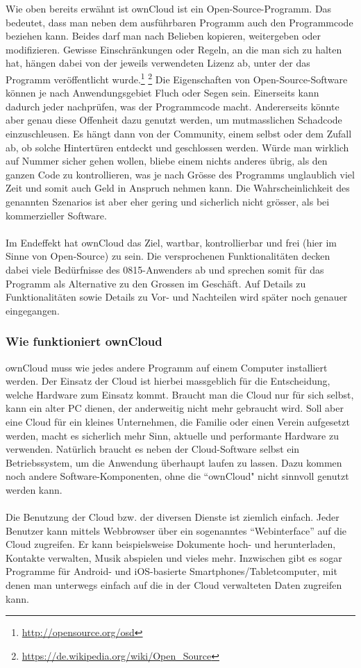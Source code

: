 Wie oben bereits erwähnt ist ownCloud ist ein Open-Source-Programm. Das bedeutet, dass man neben dem ausführbaren Programm auch den Programmcode beziehen kann. Beides darf man nach Belieben kopieren, weitergeben oder modifizieren. Gewisse Einschränkungen oder Regeln, an die man sich zu halten hat, hängen dabei von der jeweils verwendeten Lizenz ab, unter der das Programm veröffentlicht wurde.\footnote{\url{http://opensource.org/osd}} \footnote{\url{https://de.wikipedia.org/wiki/Open_Source}}
Die Eigenschaften von Open-Source-Software können je nach Anwendungsgebiet Fluch oder Segen sein. Einerseits kann dadurch jeder nachprüfen, was der Programmcode macht. Andererseits könnte aber genau diese Offenheit dazu genutzt werden, um mutmasslichen Schadcode einzuschleusen. Es hängt dann von der Community, einem selbst oder dem Zufall ab, ob solche Hintertüren entdeckt und geschlossen werden. Würde man wirklich auf Nummer sicher gehen wollen, bliebe einem nichts anderes übrig, als den ganzen Code zu kontrollieren, was je nach Grösse des Programms unglaublich viel Zeit und somit auch Geld in Anspruch nehmen kann. Die Wahrscheinlichkeit des genannten Szenarios ist aber eher gering und sicherlich nicht grösser, als bei kommerzieller Software.
\\
\\
Im Endeffekt hat ownCloud das Ziel, wartbar, kontrollierbar und frei (hier im Sinne von Open-Source) zu sein. Die versprochenen Funktionalitäten decken dabei viele Bedürfnisse des 0815-Anwenders ab und sprechen somit für das Programm als Alternative zu den Grossen im Geschäft. Auf Details zu Funktionalitäten sowie Details zu Vor- und Nachteilen wird später noch genauer eingegangen.

\subsubsection{Wie funktioniert ownCloud}
ownCloud muss wie jedes andere Programm auf einem Computer installiert werden. Der Einsatz der Cloud ist hierbei massgeblich für die Entscheidung, welche Hardware zum Einsatz kommt. Braucht man die Cloud nur für sich selbst, kann ein alter PC dienen, der anderweitig nicht mehr gebraucht wird. Soll aber eine Cloud für ein kleines Unternehmen, die Familie oder einen Verein aufgesetzt werden, macht es sicherlich mehr Sinn, aktuelle und performante Hardware zu verwenden. Natürlich braucht es neben der Cloud-Software selbst ein Betriebssystem, um die Anwendung überhaupt laufen zu lassen. Dazu kommen noch andere Software-Komponenten, ohne die ``ownCloud" nicht sinnvoll genutzt werden kann.
\\
\\
Die Benutzung der Cloud bzw. der diversen Dienste ist ziemlich einfach. Jeder Benutzer kann mittels Webbrowser über ein sogenanntes ``Webinterface'' auf die Cloud zugreifen. Er kann beispielsweise Dokumente hoch- und herunterladen, Kontakte verwalten, Musik abspielen und vieles mehr.
Inzwischen gibt es sogar Programme für Android- und iOS-basierte Smartphones/Tabletcomputer, mit denen man unterwegs einfach auf die in der Cloud verwalteten Daten zugreifen kann.

